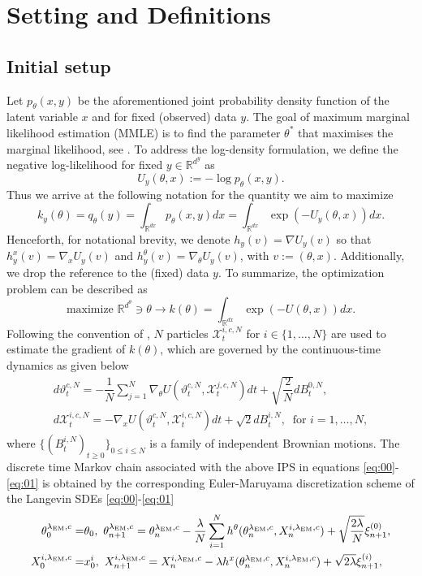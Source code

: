 \documentclass[a4paper, 10pt]{article}
\theoremstyle{plain}%
\begin{document}
\section{Setting and Definitions}
\subsection{Initial setup}
Let $p_{\theta}(x,y)$ be the aforementioned joint probability density function of the latent variable $x$ and for fixed (observed) data $y$. The goal of maximum marginal likelihood estimation (MMLE) is to find the parameter $\theta^*$ that maximises the marginal likelihood, see \cite{EM}. To address the log-density formulation, we define the negative log-likelihood for fixed $y\in\mathbb{R}^{d^y}$ as $$U_{y}(\theta,x):=-\log p_{\theta}(x,y).$$ Thus we arrive at the following notation for the quantity we aim to maximize $$k_{y}(\theta)=q_{\theta}(y)=\int_{\mathbb{R}^{dx}} p_{\theta}(x,y)dx=\int_{\mathbb{R}^{dx}} \exp{(-U_{y}(\theta,x))}dx.$$ Henceforth, for notational brevity, we denote $h_{y}(v)=\nabla U_{y}(v)$ so that $h^{x}_{y}(v)=\nabla_x U_{y}(v)$ and $h^{\theta}_{y}(v)=\nabla_{\theta}U_{y}(v)$, with $v:=(\theta,x)$. Additionally, we drop the reference to the (fixed) data $y$. To summarize, the optimization problem can be described as $$\text{maximize }\mathbb{R}^{d^{\theta}}\ni \theta \rightarrow k(\theta)=\int_{\mathbb{R}^{dx}} \exp{(-U(\theta,x))}dx.$$ Following the convention of \cite{Kuntz}, $N$ particles $\mathcal{X}_t^{i,c,N}$ for $i\in\{1,\ldots,N\}$ are used to estimate the gradient of $k(\theta)$, which are governed by the continuous-time dynamics as given below
\begin{gather}
d\vartheta_t^{c,N}=-\dfrac{1}{N}\sum_{j=1}^N\nabla_{\theta}U(\vartheta_t^{c,N},\mathcal{X}^{j,c,N}_t)dt+\sqrt{\dfrac{2}{N}}dB_t^{0,N},\label{eq:00}\\d\mathcal{X}_t^{i,c,N}=-\nabla_{x}U(\vartheta_t^{c,N},\mathcal{X}^{i,c,N}_t)dt+\sqrt{2}dB_t^{i,N},\ \label{eq:01} \text{ for } i=1,\ldots,N,
\end{gather}
where $\{(B_t^{i,N})_{t\geq 0}\}_{0\leq i\leq N}$ is a family of independent Brownian motions. The discrete time Markov chain associated with the above IPS in equations \eqref{eq:00}-\eqref{eq:01} is obtained by the corresponding Euler-Maruyama discretization scheme of the Langevin SDEs \eqref{eq:00}-\eqref{eq:01}
\begin{align*}
\theta^{{\lambda}_{\text{\tiny{EM}}},c}_0=&\theta_0,\ \theta_{n+1}^{{\lambda}_{\text{\tiny{EM}}},c}=\theta_{n}^{\lambda_{\text{\tiny{EM}}},c}-\dfrac{\lambda}{N}\sum_{i=1}^N h^{\theta}(\theta_{n}^{\lambda_{\text{\tiny{EM}}},c},X_{n}^{i,\lambda_{\text{\tiny{EM}}},c})+\sqrt{\dfrac{2\lambda}{N}}\xi^{(0)}_{n+1},\\
X^{i,\lambda_{\text{\tiny{EM}}},c}_0=&x^i_0,\ X_{n+1}^{i,\lambda_{\text{\tiny{EM}}},c}=X_{n}^{i,\lambda_{\text{\tiny{EM}}},c}-\lambda h^{x}(\theta_{n}^{\lambda_{\text{\tiny{EM}}},c},X_{n}^{i,\lambda_{\text{\tiny{EM}}},c})+\sqrt{2\lambda}\xi^{(i)}_{n+1},\ 
\end{align*}
\end{document}
